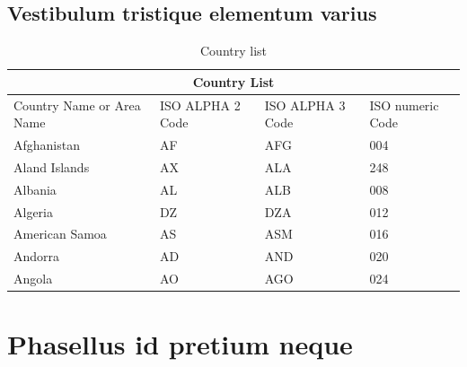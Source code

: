\subsection{Vestibulum tristique elementum varius}
\blindtext

\begin{table}[!ht]
	\caption{Country list}\label{t:1}
	\smallskip
	\centering

	\begin{tabular}{ |p{3cm}||p{3cm}|p{3cm}|p{3cm}|  }
		\hline
		\multicolumn{4}{|c|}{Country List} \\
		\hline
		Country Name or Area Name& ISO ALPHA 2 Code &ISO ALPHA 3 Code&ISO numeric Code\\
		\hline
		Afghanistan & AF & AFG & 004\\
		Aland Islands & AX & ALA & 248\\
		Albania & AL & ALB & 008\\
		Algeria & DZ & DZA & 012\\
		American Samoa & AS & ASM & 016\\
		Andorra & AD & AND & 020\\
		Angola & AO & AGO & 024\\
		\hline
	\end{tabular}
\end{table}


\section{Phasellus id pretium neque}
\blindtext

\blindtext
